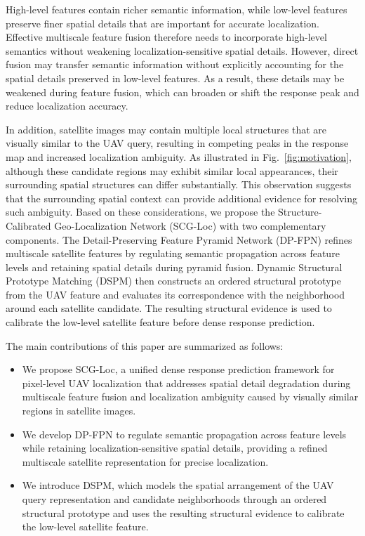 \documentclass[runningheads]{llncs}
\begin{document}
High-level features contain richer semantic information, while low-level features preserve finer spatial details that are important for accurate localization. Effective multiscale feature fusion therefore needs to incorporate high-level semantics without weakening localization-sensitive spatial details. However, direct fusion may transfer semantic information without explicitly accounting for the spatial details preserved in low-level features. As a result, these details may be weakened during feature fusion, which can broaden or shift the response peak and reduce localization accuracy.

In addition, satellite images may contain multiple local structures that are visually similar to the UAV query, resulting in competing peaks in the response map and increased localization ambiguity. As illustrated in Fig.~\ref{fig:motivation}, although these candidate regions may exhibit similar local appearances, their surrounding spatial structures can differ substantially. This observation suggests that the surrounding spatial context can provide additional evidence for resolving such ambiguity. Based on these considerations, we propose the Structure-Calibrated Geo-Localization Network (SCG-Loc) with two complementary components. The Detail-Preserving Feature Pyramid Network (DP-FPN) refines multiscale satellite features by regulating semantic propagation across feature levels and retaining spatial details during pyramid fusion. Dynamic Structural Prototype Matching (DSPM) then constructs an ordered structural prototype from the UAV feature and evaluates its correspondence with the neighborhood around each satellite candidate. The resulting structural evidence is used to calibrate the low-level satellite feature before dense response prediction.

The main contributions of this paper are summarized as follows:

\begin{itemize}
\item We propose SCG-Loc, a unified dense response prediction framework for pixel-level UAV localization that addresses spatial detail degradation during multiscale feature fusion and localization ambiguity caused by visually similar regions in satellite images.
\item We develop DP-FPN to regulate semantic propagation across feature levels while retaining localization-sensitive spatial details, providing a refined multiscale satellite representation for precise localization.
\item We introduce DSPM, which models the spatial arrangement of the UAV query representation and candidate neighborhoods through an ordered structural prototype and uses the resulting structural evidence to calibrate the low-level satellite feature.
\end{itemize}
\end{document}
